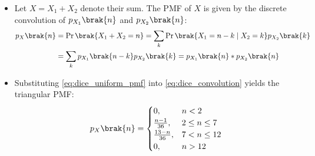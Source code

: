 \begin{enumerate}[label=\thesubsection.\arabic*, ref=\thesubsection.\theenumi]
\begin{itemize}
\item Let $X = X_1 + X_2$ denote their sum. The PMF of $X$ is given by the discrete convolution of $p_{X_1}\brak{n}$ and $p_{X_2}\brak{n}$:
\begin{align}
p_X\brak{n} &= \Pr\brak{X_1 + X_2 = n} = \sum_{k} \Pr\brak{X_1 = n - k \mid X_2 = k} p_{X_2}\brak{k} \\
&= \sum_{k} p_{X_1}\brak{n - k} p_{X_2}\brak{k} = p_{X_1}\brak{n} * p_{X_2}\brak{n} \label{eq:dice_convolution}
\end{align}

\item Substituting \eqref{eq:dice_uniform_pmf} into \eqref{eq:dice_convolution} yields the triangular PMF:
\begin{align}
p_X\brak{n} = \begin{cases} 
0, & n < 2 \\ 
\frac{n - 1}{36}, & 2 \le n \le 7 \\ 
\frac{13 - n}{36}, & 7 < n \le 12 \\ 
0, & n > 12 
\end{cases} \label{eq:triangular_pmf}
\end{align}
\end{itemize}

\end{enumerate}